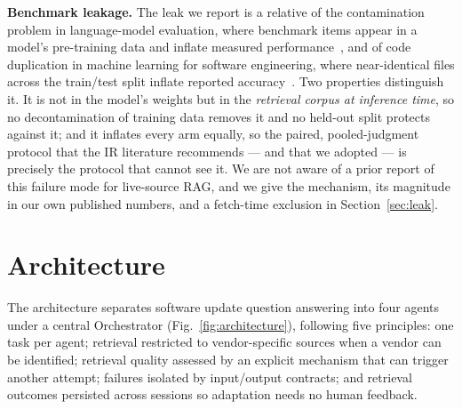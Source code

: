 \documentclass[10pt,conference]{IEEEtran}
\begin{document}
\textbf{Benchmark leakage.} The leak we report is a relative of the contamination
problem in language-model evaluation, where benchmark items appear in a model's
pre-training data and inflate measured
performance~\cite{sainz2023contamination}, and of code duplication in machine
learning for software engineering, where near-identical files across the
train/test split inflate reported accuracy~\cite{allamanis2019duplication}. Two
properties distinguish it. It is not in the model's weights but in the
\emph{retrieval corpus at inference time}, so no decontamination of training data
removes it and no held-out split protects against it; and it inflates every arm
equally, so the paired, pooled-judgment protocol that the IR literature
recommends --- and that we adopted --- is precisely the protocol that cannot see
it. We are not aware of a prior report of this failure mode for live-source RAG,
and we give the mechanism, its magnitude in our own published numbers, and a
fetch-time exclusion in Section~\ref{sec:leak}.

\section{Architecture}\label{sec:method}

The architecture separates software update question answering into four agents
under a central Orchestrator (Fig.~\ref{fig:architecture}), following five
principles: one task per agent; retrieval restricted to vendor-specific sources
when a vendor can be identified; retrieval quality assessed by an explicit
mechanism that can trigger another attempt; failures isolated by input/output
contracts; and retrieval outcomes persisted across sessions so adaptation needs
no human feedback.
\end{document}
